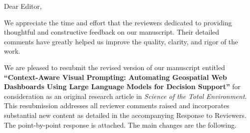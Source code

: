 \documentclass{ornl-letter}
\begin{document}
\subjectline{} %


\printaddblock %


Dear Editor,

We appreciate the time and effort that the reviewers dedicated to providing thoughtful and constructive feedback on our manuscript. Their detailed comments have greatly helped us improve the quality, clarity, and rigor of the work.

We are pleased to resubmit the revised version of our manuscript entitled \textbf{``Context-Aware Visual Prompting: Automating Geospatial Web Dashboards Using Large Language Models for Decision Support''} for consideration as an original research article in \textit{Science of the Total Environment}. This resubmission addresses all reviewer comments raised and incorporates substantial new content as detailed in the accompanying Response to Reviewers. The point-by-point response is attached. The main changes are the following.
\end{document}
